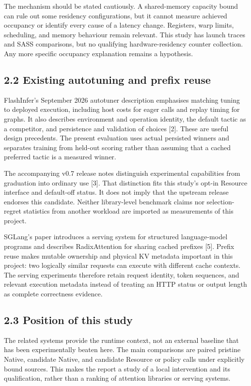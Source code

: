 \documentclass[11pt,a4paper]{article}
\begin{document}
The mechanism should be stated cautiously. A shared-memory capacity bound can rule out some residency configurations, but it cannot measure achieved occupancy or identify every cause of a latency change. Registers, warp limits, scheduling, and memory behaviour remain relevant. This study has launch traces and SASS comparisons, but no qualifying hardware-residency counter collection. Any more specific occupancy explanation remains a hypothesis.


\subsection*{2.2 Existing autotuning and prefix reuse}

FlashInfer's September 2026 autotuner description emphasises matching tuning to deployed execution, including host costs for eager calls and replay timing for graphs. It also describes environment and operation identity, the default tactic as a competitor, and persistence and validation of choices [2]. These are useful design precedents. The present evaluation uses actual persisted winners and separates training from held-out scoring rather than assuming that a cached preferred tactic is a measured winner.


The accompanying v0.7 release notes distinguish experimental capabilities from graduation into ordinary use [3]. That distinction fits this study's opt-in Resource interface and default-off status. It does not imply that the upstream release endorses this candidate. Neither library-level benchmark claims nor selection-regret statistics from another workload are imported as measurements of this project.


SGLang's paper introduces a serving system for structured language-model programs and describes RadixAttention for sharing cached prefixes [5]. Prefix reuse makes mutable ownership and physical KV metadata important in this project: two logically similar requests can execute with different cache contexts. The serving experiments therefore retain request identity, token sequences, and relevant execution metadata instead of treating an HTTP status or output length as complete correctness evidence.


\subsection*{2.3 Position of this study}

The related systems provide the runtime context, not an external baseline that has been experimentally beaten here. The main comparisons are paired pristine Native, candidate Native, and candidate Resource or policy calls under explicitly bound sources. This makes the report a study of a local intervention and its qualification, rather than a ranking of attention libraries or serving systems.
\end{document}
